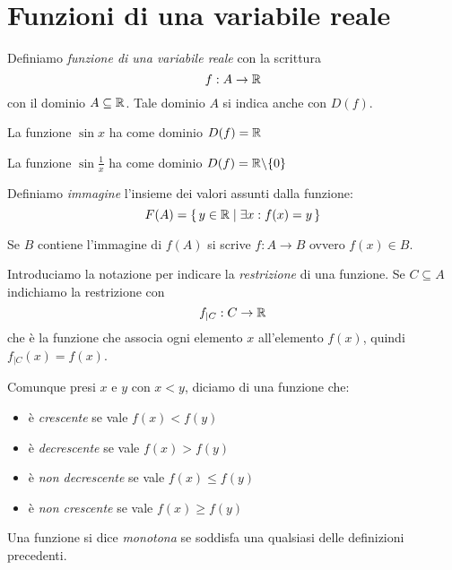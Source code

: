 \section{Funzioni di una variabile reale}

Definiamo \emph{funzione di una variabile reale} con la scrittura
\begin{equation*}
f: A \to \mathbb R
\end{equation*}
con il dominio $A \subseteq \mathbb R$. Tale dominio $A$ si indica anche con $D(f)$.

\begin{example}
La funzione $\sin x$ ha come dominio $D(f) = \mathbb R$
\end{example} 
\begin{example}
La funzione $\sin \frac{1}{x}$ ha come dominio $D(f) = \mathbb R \backslash \{0\}$
\end{example} 

Definiamo \emph{immagine} l'insieme dei valori assunti dalla funzione:
\begin{equation*}
F(A) = \set{y \in \mathbb R| \exists x : f(x) = y}
\end{equation*}

Se $B$ contiene l'immagine di $f(A)$ si scrive $f: A \to B$ ovvero $f(x) \in B$.

Introduciamo la notazione per indicare la \emph{restrizione} di una funzione. Se $C \subseteq A$ indichiamo la restrizione con
\begin{equation*}
f_{|C} : C \to \mathbb R
\end{equation*}
che è la funzione che associa ogni elemento $x$ all'elemento $f(x)$, quindi $f_{|C} (x) = f(x)$.

\begin{definition}
Comunque presi $x$ e $y$ con $x < y$, diciamo di una funzione che:
\begin{itemize}
\item è \emph{crescente} se vale $f(x) < f(y)$
\item è \emph{decrescente} se vale $f(x) > f(y)$
\item è \emph{non decrescente} se vale $f(x) \le f(y)$
\item è \emph{non crescente} se vale $f(x) \ge f(y)$
\end{itemize}
\end{definition}

\begin{definition}
Una funzione si dice \emph{monotona} se soddisfa una qualsiasi delle definizioni precedenti.
\end{definition}


